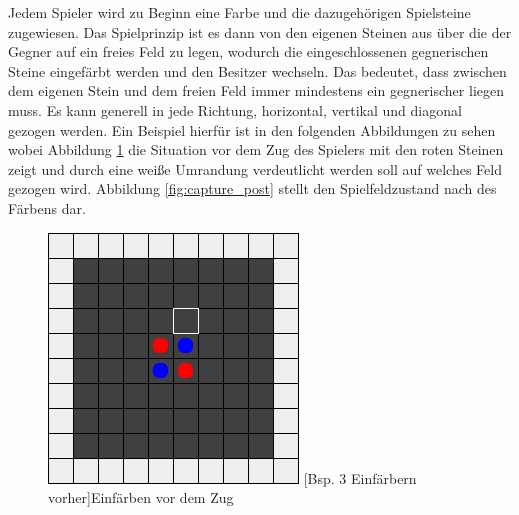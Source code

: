 \documentclass[12pt,a4paper,bibliography=totocnumbered,listof=totocnumbered]{article}
\begin{document}
Jedem Spieler wird zu Beginn eine Farbe und die dazugehörigen Spielsteine zugewiesen. Das Spielprinzip ist es dann von den eigenen Steinen aus über die der Gegner auf ein freies Feld zu legen, wodurch die eingeschlossenen gegnerischen Steine eingefärbt werden und den Besitzer wechseln. Das bedeutet, dass zwischen dem eigenen Stein und dem freien Feld immer mindestens ein gegnerischer liegen muss. Es kann generell in jede Richtung, horizontal, vertikal und diagonal gezogen werden. Ein Beispiel hierfür ist in den folgenden Abbildungen zu sehen wobei Abbildung \ref{fig:capture_pre} die Situation vor dem Zug des Spielers mit den roten Steinen zeigt und durch eine weiße Umrandung verdeutlicht werden soll auf welches Feld gezogen wird. Abbildung \ref{fig:capture_post} stellt den Spielfeldzustand nach des Färbens dar.

\begin{figure}[H]
\centering
\begin{minipage}[c]{0.4\textwidth}
	\centering
	\includegraphics[width=\textwidth]{pics/reversi_original_map_capture_1.png}
	[Bsp. 3 Einfärbern vorher]{Einfärben vor dem Zug}
	\label{fig:capture_pre}
\end{minipage}
\hspace{0.1\textwidth}
\begin{minipage}[c]{0.4\textwidth}

\end{minipage}
\end{figure}
\end{document}
